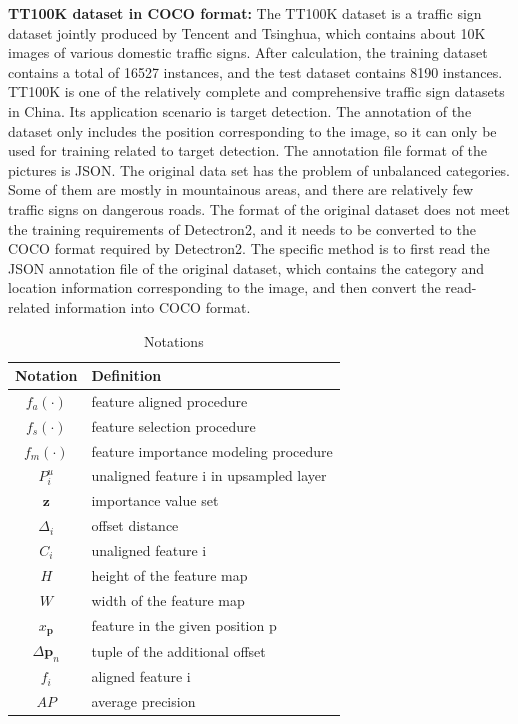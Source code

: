 \textbf{TT100K dataset in COCO format:} The TT100K dataset is a traffic sign dataset jointly produced by Tencent and Tsinghua, which contains about 10K images of various domestic traffic signs. After calculation, the training dataset contains a total of 16527 instances, and the test dataset contains 8190 instances. TT100K is one of the relatively complete and comprehensive traffic sign datasets in China. Its application scenario is target detection. The annotation of the dataset only includes the position corresponding to the image, so it can only be used for training related to target detection. The annotation file format of the pictures is JSON. The original data set has the problem of unbalanced categories. Some of them are mostly in mountainous areas, and there are relatively few traffic signs on dangerous roads. The format of the original dataset does not meet the training requirements of Detectron2, and it needs to be converted to the COCO format required by Detectron2. The specific method is to first read the JSON annotation file of the original dataset, which contains the category and location information corresponding to the image, and then convert the read-related information into COCO format.

\begin{table}[htb]
		\begin{center}
			\caption{Notations}\label{Notation}
			\begin{tabular}{|c|l|} %
				\toprule
				\textbf{Notation} & \textbf{Definition}\\
				\hline
				$f_a(·)$ & feature aligned procedure\\
				$f_s(·)$ & feature selection procedure\\
				$f_m(·)$ & feature importance modeling procedure\\
				$P^u_i$ & unaligned feature i in upsampled layer\\
				$\textbf{z}$ & importance value set\\
				$\Delta_i$ & offset distance\\
				$C_i$ & unaligned feature i\\
				$H$ & height of the feature map\\
				$W$ & width of the feature map\\
				$x_\textbf{p}$ & feature in the given position p\\
				$\Delta\textbf{p}_n$&tuple of the additional offset\\
				$f_i$&aligned feature i\\
				$AP$&average precision\\
				\bottomrule
			\end{tabular}
		\end{center}
	\end{table}

